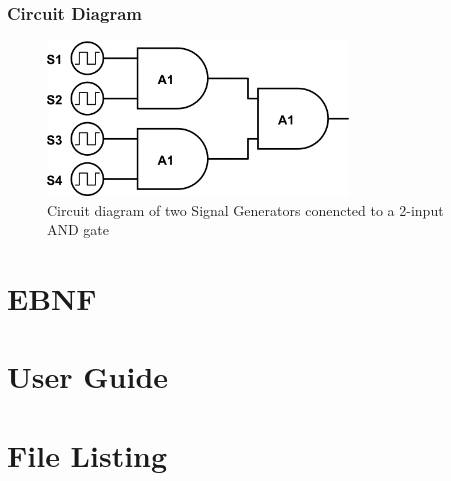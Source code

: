 \documentclass[a4paper,10pt]{article}
\begin{document}
\subsubsection{Circuit Diagram}
\begin{figure}[h]
 \centering
 \includegraphics[width=8cm]{../../examples/siggen.png} %
 \caption{Circuit diagram of two Signal Generators conencted to a 2-input AND gate}
 \label{fig:example-siggen}
\end{figure}

\pagebreak

\section{EBNF}

\pagebreak

\section{User Guide}

\pagebreak

\section{File Listing}

\pagebreak
\end{document}
